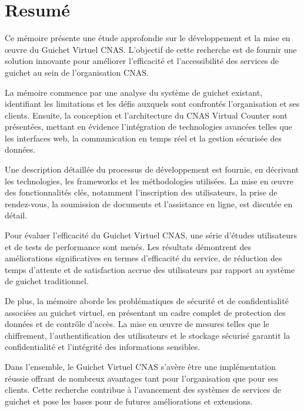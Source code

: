 \documentclass[12pt]{report}
\begin{document}
        \section*{\centering \large Resumé}
            Ce mémoire présente une étude approfondie sur le développement et la mise en œuvre du Guichet Virtuel CNAS. L'objectif de cette recherche est de fournir une solution innovante pour améliorer l'efficacité et l'accessibilité des services de guichet au sein de l'organisation CNAS.
            
            La mémoire commence par une analyse du système de guichet existant, identifiant les limitations et les défis auxquels sont confrontés l'organisation et ses clients. Ensuite, la conception et l'architecture du CNAS Virtual Counter sont présentées, mettant en évidence l'intégration de technologies avancées telles que les interfaces web, la communication en temps réel et la gestion sécurisée des données.
            
            Une description détaillée du processus de développement est fournie, en décrivant les technologies, les frameworks et les méthodologies utilisées. La mise en œuvre des fonctionnalités clés, notamment l'inscription des utilisateurs, la prise de rendez-vous, la soumission de documents et l'assistance en ligne, est discutée en détail.
            
            Pour évaluer l'efficacité du Guichet Virtuel CNAS, une série d'études utilisateurs et de tests de performance sont menés. Les résultats démontrent des améliorations significatives en termes d'efficacité du service, de réduction des temps d'attente et de satisfaction accrue des utilisateurs par rapport au système de guichet traditionnel.
            
            De plus, la mémoire aborde les problématiques de sécurité et de confidentialité associées au guichet virtuel, en présentant un cadre complet de protection des données et de contrôle d'accès. La mise en œuvre de mesures telles que le chiffrement, l'authentification des utilisateurs et le stockage sécurisé garantit la confidentialité et l'intégrité des informations sensibles.
            
            Dans l'ensemble, le Guichet Virtuel CNAS s'avère être une implémentation réussie offrant de nombreux avantages tant pour l'organisation que pour ses clients. Cette recherche contribue à l'avancement des systèmes de services de guichet et pose les bases pour de futures améliorations et extensions.
            \vspace*{\fill}
        \thispagestyle{empty}  
                    
\end{document}
